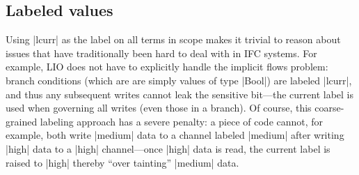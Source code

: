 %
%

\subsection{Labeled values}

Using |lcurr| as the label on all terms in scope makes it trivial to
reason about issues that have traditionally been hard to deal with in
IFC systems.
%
For example, LIO does not have to explicitly handle the implicit flows
problem: branch conditions (which are are simply values of type
|Bool|) are labeled |lcurr|, and thus any subsequent writes cannot leak
the sensitive bit---the current label is used when governing all
writes (even those in a branch).
%
Of course, this coarse-grained labeling approach has a severe penalty: a piece
of code cannot, for example, both write |medium| data to a channel
labeled |medium| after writing |high| data to a |high| channel---once
|high| data is read, the current label is raised to |high| thereby
``over tainting'' |medium| data.
 
